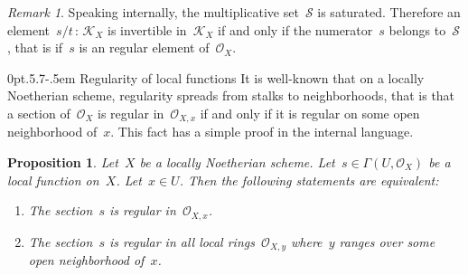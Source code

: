 \documentclass[10pt,reqno,a4paper]{amsbook}
\makeatletter
\theoremstyle{definition}
\theoremstyle{plain}
\newtheorem{prop}[defn]{Proposition}
\theoremstyle{remark}
\newtheorem{rem}[defn]{Remark}
\renewcommand{\O}{\mathcal{O}}
\newcommand{\K}{\mathcal{K}}
\newcommand{\T}{\mathcal{T}}
\renewcommand{\S}{\mathcal{S}}
\newcommand{\?}{\,{:}\,}
\renewcommand{\_}{\mathpunct{.}\,}
\def\subsection{\@startsection{subsection}{2}%
  {0pt}{.5\linespacing\@plus.7\linespacing}{-.5em}%
  {\normalfont\bfseries}}
\makeatother
\begin{document}
\begin{rem}Speaking internally, the multiplicative set~$\S$ is saturated.
Therefore an element~$s/t \? \K_X$ is invertible in~$\K_X$ if and only if the
numerator~$s$ belongs to~$\S$, that is if~$s$ is an regular element of~$\O_X$.\end{rem}

%


\subsection{Regularity of local functions}
It is well-known that on a locally Noetherian scheme, regularity spreads from
stalks to neighborhoods, that is that a section of~$\O_X$ is regular
in~$\O_{X,x}$ if and only if it is regular on some open neighborhood of~$x$.
This fact has a simple proof in the internal language.
\begin{prop}\label{prop:regularity-spreading}
Let~$X$ be a locally Noetherian scheme. Let~$s \in \Gamma(U,\O_X)$
be a local function on~$X$. Let~$x \in U$. Then the following statements are
equivalent:
\begin{enumerate}
\item The section~$s$ is regular in~$\O_{X,x}$.
\item The section~$s$ is regular in all local rings~$\O_{X,y}$ where~$y$ ranges
over some open neighborhood of~$x$.
\end{enumerate}
\end{prop}
\end{document}
